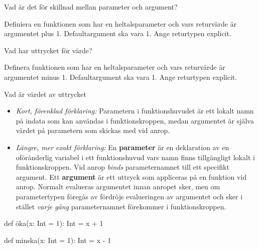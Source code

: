 \Subtask Vad är det för skillnad mellan parameter och argument?

\Subtask Definiera en funktionen  som har en heltalsparameter  och vars returvärde är argumentet plus 1. Defaultargument ska vara 1. Ange returtypen explicit.

\Subtask Vad har uttrycket  för värde?

\Subtask Definera funktionen  som har en heltalsparameter  och vars returvärde är argumentet minus 1. Defaultargument ska vara 1. Ange returtypen explicit.

\Subtask Vad är värdet av uttrycket 

\SOLUTION

\TaskSolved \what

\SubtaskSolved

\begin{itemize}
  \item \emph{Kort, förenklad förklaring:} Parametern i funktionshuvudet är ett lokalt namn på indata som kan användas i funktionskroppen, medan argumentet är själva värdet på parametern som skickas med vid anrop.
  \item \emph{Längre, mer exakt förklaring:} En \textbf{parameter} är en deklaration av en oföränderlig variabel i ett funktionshuvud vars namn finns tillgängligt lokalt i funktionskroppen. Vid anrop \emph{binds} parameternamnet till ett specifikt argument. Ett \textbf{argument} är ett uttryck som  appliceras på en funktion vid anrop. Normalt evalueras argumentet innan anropet sker, men om parametertypen föregås av \code{=>} fördröjs evalueringen av argumentet och sker i stället \emph{varje gång} parameternamnet förekommer i funktionskroppen.
\end{itemize}

\SubtaskSolved
\begin{Code}
def öka(x: Int = 1): Int = x + 1
\end{Code}

\SubtaskSolved  {}

\SubtaskSolved
\begin{Code}
def minska(x: Int = 1): Int = x - 1
\end{Code}

\SubtaskSolved  {}

\QUESTEND





